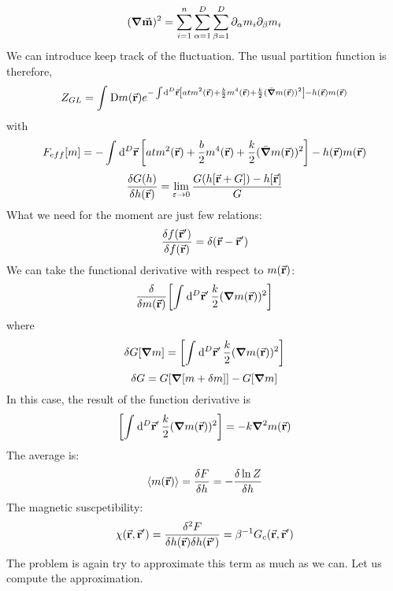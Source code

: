 \documentclass[../main/main.tex]{subfiles}
\begin{document}
\begin{equation}
  (\grad \va{m})^2 = \sum_{i=1}^{n} \sum_{\alpha =1}^{D} \sum_{\beta =1}^{D} \partial_ \alpha {m_i} \partial_ \beta  {m_i}
\end{equation}
We can introduce keep track of the fluctuation.
The usual partition function is therefore,
\begin{equation}
  Z_{GL} = \int_{}^{} \text{D} m(\va{r}) e^{  -\int_{}^{} \dd[D]{\va{r}} \qty[a t m^2 (\va{r}) + \frac{b}{2} m^4 (\va{r}) + \frac{k}{2} (\bar{\grad } m (\va{r}))^2] - h(\va{r})m(\va{r})  }
\end{equation}
with
\begin{equation}
  F_{eff}[m] = -\int_{}^{} \dd[D]{\va{r}} \qty[a t m^2 (\va{r}) + \frac{b}{2} m^4 (\va{r}) + \frac{k}{2} (\bar{\grad } m (\va{r}))^2] - h(\va{r})m(\va{r})
\end{equation}
\begin{equation}
  \frac{\delta G(h)}{\delta h (\va{r})} = \lim_{\varepsilon \rightarrow 0} \frac{G(h[\va{r}+G])-h[\va{r}]}{G}
\end{equation}
What we need for the moment are just few relations:
\begin{equation}
  \frac{\delta f (\va{r}')}{\delta f (\va{r})} = \delta (\va{r}-\va{r}')
\end{equation}
We can take the functional derivative with respect to \( m(\va{r}) \):
\begin{equation}
  \frac{\delta }{\delta m(\va{r})} \qty[ \int_{}^{} \dd[D]{\va{r}'} \frac{k}{2} ( \grad m(\va{r}))^2  ]
\end{equation}
where
\begin{equation}
  \delta G [ \grad m] = \qty[ \int_{}^{} \dd[D]{\va{r}'} \frac{k}{2} ( \grad m(\va{r}))^2  ]
\end{equation}
\begin{equation}
  \delta G = G \qty[ \grad [m+\delta m]] - G [\grad m]
\end{equation}
In this case, the result of the function derivative is
\begin{equation}
  \qty[ \int_{}^{} \dd[D]{\va{r}'} \frac{k}{2} ( \grad m(\va{r}))^2  ] = - k \grad ^2 m(\va{r})
\end{equation}
The average is:
\begin{equation}
  \expval{m(\va{r})} = \frac{\delta F}{\delta h} = - \frac{\delta \ln{Z} }{\delta h}
\end{equation}
The magnetic suscpetibility:
\begin{equation}
  \chi  (\va{r},\va{r}') = \frac{\delta ^2 F}{\delta h(\va{r}) \delta h(\va{r}')} = \beta ^{-1} G_c (\va{r},\va{r}')
\end{equation}
The problem is again try to approximate this term as much as we can.
Let us compute the approximation.
\end{document}
